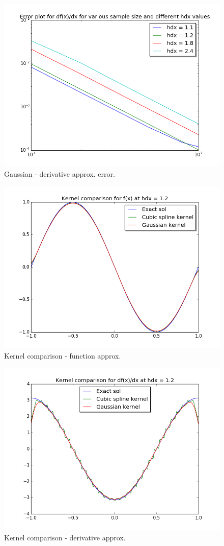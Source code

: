 \documentclass[a4paper,11pt]{article}
\begin{document}
\begin{figure}[ht]
    \centering
    \includegraphics[width=.8\linewidth]{derv_err_gau.png}
    \caption{Gaussian - derivative approx. error.}
    \label{fig:ex10}    
\end{figure}

\begin{figure}[ht]
    \centering
    \includegraphics[width=.8\linewidth]{comp_fn.png}
    \caption{Kernel comparison - function approx. }
    \label{fig:ex9}    
\end{figure}

\begin{figure}[ht]
    \centering
    \includegraphics[width=.8\linewidth]{comp_dfn.png}
    \caption{Kernel comparison - derivative approx.}
    \label{fig:ex10}    
\end{figure}
\end{document}
